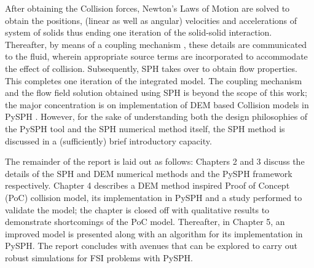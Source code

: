 After obtaining the Collision forces, Newton's Laws of Motion are solved to obtain the positions, (linear as well as angular) velocities and accelerations of system of solids thus ending one iteration of the solid-solid interaction. Thereafter, by means of a coupling mechanism \cite{akinci}, these details are communicated to the fluid, wherein appropriate source terms are incorporated to accommodate the effect of collision. Subsequently, SPH takes over to obtain flow properties. This completes one iteration of the integrated model. The coupling mechanism and the flow field solution obtained using SPH is beyond the scope of this work; the major concentration is on implementation of DEM based Collision models in PySPH \cite{prabhu_puri}. However, for the sake of understanding both the design philosophies of the PySPH tool and the SPH numerical method itself, the SPH method is discussed in a (sufficiently) brief introductory capacity.

The remainder of the report is laid out as follows: Chapters 2 and 3 discuss the details of the SPH and DEM numerical methods and the PySPH framework respectively. Chapter 4 describes a DEM method inspired Proof of Concept (PoC) collision model, its implementation in PySPH and a study performed to validate the model; the chapter is closed off with qualitative results to demonstrate shortcomings of the PoC model. Thereafter, in Chapter 5, an improved model is presented along with an algorithm for its implementation in PySPH. The report concludes with avenues that can be explored to carry out robust simulations for FSI problems with PySPH.